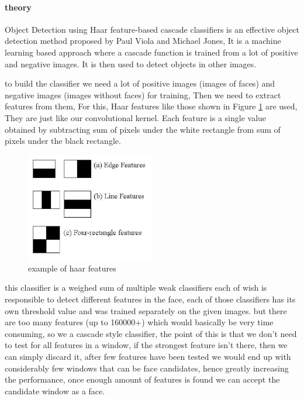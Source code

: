 \paragraph{theory}
Object Detection using Haar feature-based cascade classifiers is an effective object detection method proposed by Paul Viola and Michael Jones\cite{haar}, It is a machine learning based approach where a cascade function is trained from a lot of positive and negative images. It is then used to detect objects in other images.

to build the classifier we need a lot of positive images (images of faces) and negative images (images without faces) for training, Then we need to extract features from them, For this, Haar features like those shown in Figure \ref{fig:haar_features} are used, They are just like our convolutional kernel. Each feature is a single value obtained by subtracting sum of pixels under the white rectangle from sum of pixels under the black rectangle.

\begin{figure}
	\centering
	\includegraphics[width=0.5\textwidth]{images/haar_features.jpg}
	\caption{example of haar features}
	\label{fig:haar_features}
\end{figure}

this classifier is a weighed sum of multiple weak classifiers each of wish is responsible to detect different features in the face, each of those classifiers has its own threshold value and was trained separately on the given images.
but there are too many features (up to 160000+) which would basically be very time consuming, so we a cascade style classifier, the point of this is that we don't need to test for all features in a window, if the strongest feature isn't there, then we can simply discard it, after few features have been tested we would end up with considerably few windows that can be face candidates, hence greatly increasing the performance, once enough amount of features is found we can accept the candidate window as a face.


